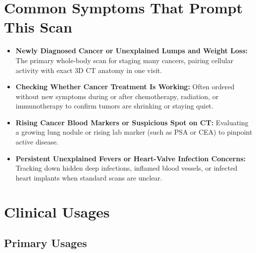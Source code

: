 \section{Common Symptoms That Prompt This Scan}
\begin{itemize}
    \item \textbf{Newly Diagnosed Cancer or Unexplained Lumps and Weight Loss:} The primary whole-body scan for staging many cancers, pairing cellular activity with exact 3D CT anatomy in one visit.
    \item \textbf{Checking Whether Cancer Treatment Is Working:} Often ordered without new symptoms during or after chemotherapy, radiation, or immunotherapy to confirm tumors are shrinking or staying quiet.
    \item \textbf{Rising Cancer Blood Markers or Suspicious Spot on CT:} Evaluating a growing lung nodule or rising lab marker (such as PSA or CEA) to pinpoint active disease.
    \item \textbf{Persistent Unexplained Fevers or Heart-Valve Infection Concerns:} Tracking down hidden deep infections, inflamed blood vessels, or infected heart implants when standard scans are unclear.
\end{itemize}

\section{Clinical Usages}

\subsection{Primary Usages}

